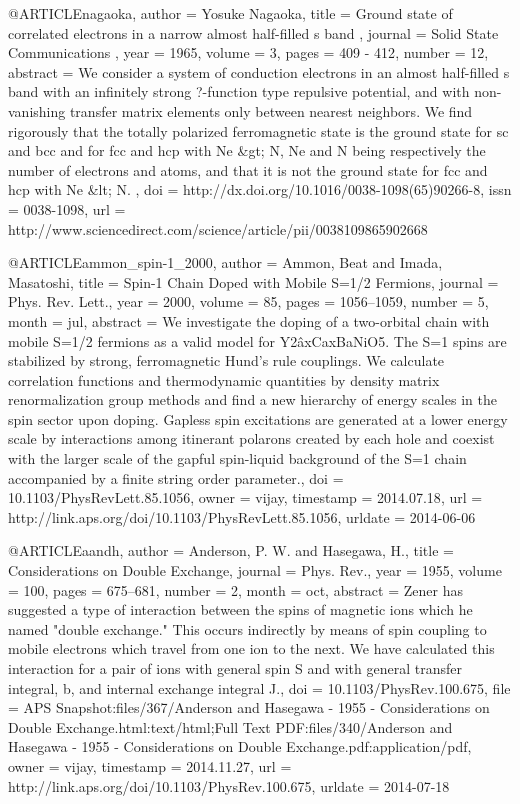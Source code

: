 @ARTICLE{nagaoka,
  author = {Yosuke Nagaoka},
  title = {Ground state of correlated electrons in a narrow almost half-filled
	s band },
  journal = {Solid State Communications },
  year = {1965},
  volume = {3},
  pages = {409 - 412},
  number = {12},
  abstract = {We consider a system of conduction electrons in an almost half-filled
	s band with an infinitely strong ?-function type repulsive potential,
	and with non-vanishing transfer matrix elements only between nearest
	neighbors. We find rigorously that the totally polarized ferromagnetic
	state is the ground state for sc and bcc and for fcc and hcp with
	Ne &gt; N, Ne and N being respectively the number of electrons and
	atoms, and that it is not the ground state for fcc and hcp with Ne
	&lt; N. },
  doi = {http://dx.doi.org/10.1016/0038-1098(65)90266-8},
  issn = {0038-1098},
  url = {http://www.sciencedirect.com/science/article/pii/0038109865902668}
}

@ARTICLE{ammon_spin-1_2000,
  author = {Ammon, Beat and Imada, Masatoshi},
  title = {Spin-1 Chain Doped with Mobile S=1/2 Fermions},
  journal = {Phys. Rev. Lett.},
  year = {2000},
  volume = {85},
  pages = {1056--1059},
  number = {5},
  month = jul,
  abstract = {We investigate the doping of a two-orbital chain with mobile S=1/2
	fermions as a valid model for {Y2âxCaxBaNiO5.} The S=1 spins are
	stabilized by strong, ferromagnetic Hund's rule couplings. We calculate
	correlation functions and thermodynamic quantities by density matrix
	renormalization group methods and find a new hierarchy of energy
	scales in the spin sector upon doping. Gapless spin excitations are
	generated at a lower energy scale by interactions among itinerant
	polarons created by each hole and coexist with the larger scale of
	the gapful spin-liquid background of the S=1 chain accompanied by
	a finite string order parameter.},
  doi = {10.1103/PhysRevLett.85.1056},
  owner = {vijay},
  timestamp = {2014.07.18},
  url = {http://link.aps.org/doi/10.1103/PhysRevLett.85.1056},
  urldate = {2014-06-06}
}

@ARTICLE{aandh,
  author = {Anderson, P. W. and Hasegawa, H.},
  title = {Considerations on Double Exchange},
  journal = {Phys. Rev.},
  year = {1955},
  volume = {100},
  pages = {675--681},
  number = {2},
  month = oct,
  abstract = {Zener has suggested a type of interaction between the spins of magnetic
	ions which he named "double exchange." This occurs indirectly by
	means of spin coupling to mobile electrons which travel from one
	ion to the next. We have calculated this interaction for a pair of
	ions with general spin S and with general transfer integral, b, and
	internal exchange integral J.},
  doi = {10.1103/PhysRev.100.675},
  file = {APS Snapshot:files/367/Anderson and Hasegawa - 1955 - Considerations on Double Exchange.html:text/html;Full Text PDF:files/340/Anderson and Hasegawa - 1955 - Considerations on Double Exchange.pdf:application/pdf},
  owner = {vijay},
  timestamp = {2014.11.27},
  url = {http://link.aps.org/doi/10.1103/PhysRev.100.675},
  urldate = {2014-07-18}
}

